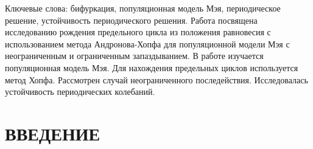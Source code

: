 \documentclass[12pt]{article}
\begin{document}
Ключевые слова: бифуркация, популяционная модель Мэя, периодическое решение, устойчивость периодического решения.
Работа посвящена  исследованию рождения предельного цикла из положения равновесия с использованием метода Андронова-Хопфа для популяционной модели Мэя с неограниченным и ограниченным запаздыванием.
 В работе изучается популяционная модель Мэя. Для нахождения предельных циклов используется метод Хопфа. Рассмотрен случай неограниченного последействия. Исследовалась устойчивость периодических колебаний.


\cleardoublepage                     
{}         

\tableofcontents

\cleardoublepage                   
{}         

\setcounter{page}{4}  

\section*{ВВЕДЕНИЕ}
\end{document}
